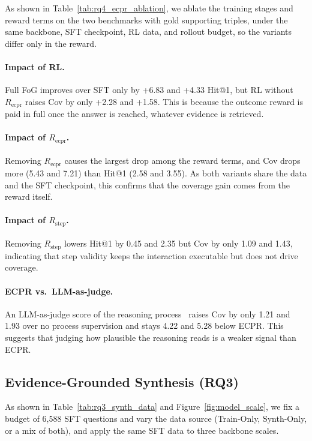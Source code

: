 As shown in Table~\ref{tab:rq4_ecpr_ablation}, we ablate the training stages and reward terms on the two benchmarks with gold supporting triples, under the same backbone, SFT checkpoint, RL data, and rollout budget, so the variants differ only in the reward.

\paragraph{Impact of RL.}
Full FoG improves over SFT only by +6.83 and +4.33 Hit@1, but RL without $R_{\text{ecpr}}$ raises Cov by only +2.28 and +1.58. This is because the outcome reward is paid in full once the answer is reached, whatever evidence is retrieved.

\paragraph{Impact of $R_{\text{ecpr}}$.}
Removing $R_{\text{ecpr}}$ causes the largest drop among the reward terms, and Cov drops more (5.43 and 7.21) than Hit@1 (2.58 and 3.55). As both variants share the data and the SFT checkpoint, this confirms that the coverage gain comes from the reward itself.

\paragraph{Impact of $R_{\text{step}}$.}
Removing $R_{\text{step}}$ lowers Hit@1 by 0.45 and 2.35 but Cov by only 1.09 and 1.43, indicating that step validity keeps the interaction executable but does not drive coverage.

\paragraph{ECPR vs.\ LLM-as-judge.}
An LLM-as-judge score of the reasoning process~\citep{KG-Hopper} raises Cov by only 1.21 and 1.93 over no process supervision and stays 4.22 and 5.28 below ECPR. This suggests that judging how plausible the reasoning reads is a weaker signal than ECPR.

\subsection{Evidence-Grounded Synthesis (RQ3)}
\label{sec:rq3}

As shown in Table~\ref{tab:rq3_synth_data} and Figure~\ref{fig:model_scale}, we fix a budget of 6,588 SFT questions and vary the data source (Train-Only, Synth-Only, or a mix of both), and apply the same SFT data to three backbone scales.


